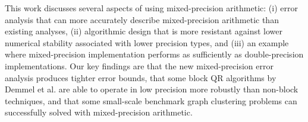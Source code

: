 \documentclass[review,onefignum,onetabnum]{siamart190516}
\begin{document}
This work discusses several aspects of using mixed-precision arithmetic: (i) error analysis that can more accurately describe mixed-precision arithmetic than existing analyses, (ii) algorithmic design that is more resistant against lower numerical stability associated with lower precision types, and (iii) an example where mixed-precision implementation performs as sufficiently as double-precision implementations. 
Our key findings are that the new mixed-precision error analysis produces tighter error bounds, that some block QR algorithms by Demmel et al. \cite{Demmel2012} are able to operate in low precision more robustly than non-block techniques, and that some small-scale benchmark graph clustering problems can successfully solved with mixed-precision arithmetic.



\end{document}
